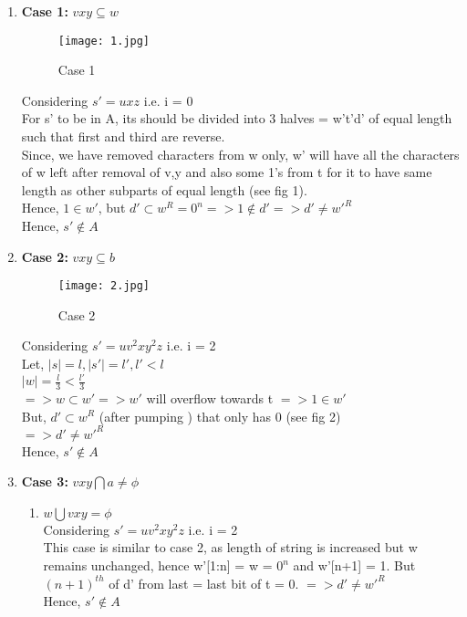 \documentclass{article}
\begin{document}
\begin{enumerate}
    \item \textbf{Case 1:} $vxy \subseteq w $ \\
    
    \begin{figure}[H]
        \centering
        \texttt{[image: 1.jpg]}
        \caption{Case 1}
    \end{figure}

    Considering $s' = uxz$ i.e. i = 0\\
    For s' to be in A, its should be divided into 3 halves = w't'd' of equal length such that first and third are reverse.\\ 
    Since, we have removed characters from w only, w' will have all the characters of w left after removal of v,y and also some 1's 
    from t for it to have same length as other subparts of equal length (see fig 1).\\
    Hence, $1 \in w'$, but $d' \subset w^R = 0^n => 1 \notin d' => d' \neq w'^R$\\
    Hence, $s' \notin A$\\
    
    \item \textbf{Case 2:} $vxy \subseteq b $ \\

    \begin{figure}[H]
        \centering
        \texttt{[image: 2.jpg]}
        \caption{Case 2}
    \end{figure}

    Considering $s' = uv^2xy^2z$ i.e. i = 2\\
    Let, $|s| = l, |s'| = l', l' < l$\\
    $|w| = \frac{l}{3} < \frac{l'}{3}$\\
    $=> w \subset w' => w' $ will overflow towards t $=> 1 \in w'$\\
    But, $d' \subset w^R $ (after pumping ) that only has 0 (see fig 2)\\
    $=> d' \neq w'^R$\\
    Hence, $s' \notin A$\\

    \item \textbf{Case 3:} $vxy \bigcap a \neq \phi$\\
    
    \begin{enumerate}
        \item $w \bigcup vxy = \phi$\\
        Considering $s' = uv^2xy^2z$ i.e. i = 2\\
        This case is similar to case 2, as length of string is increased but w remains unchanged, hence w'[1:n] = w = $0^n$ and w'[n+1] = 1.
        But $(n+1)^{th}$ of d' from last = last bit of t = 0.
        $=> d' \neq w'^R$\\
        Hence, $s' \notin A$\\


\end{enumerate}
\end{enumerate}
\end{document}
